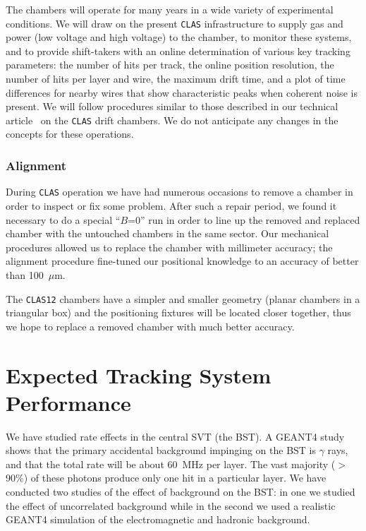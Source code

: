 The chambers will operate for many years in a wide variety of experimental
conditions.  We will draw on the present {\tt CLAS} infrastructure to supply 
gas and power (low voltage and high voltage) to the chamber, to monitor these 
systems, and to provide shift-takers with an online determination of various 
key tracking parameters: the number of hits per track, the online position 
resolution, the number of hits per layer and wire, the maximum drift time, 
and a plot of time differences for nearby wires that show characteristic 
peaks when coherent noise is present.  We will follow procedures similar to 
those described in our technical article~\cite{dcnim} on the {\tt CLAS} 
drift chambers.  We do not anticipate any changes in the concepts for these 
operations.

\subsubsection{Alignment}

During {\tt CLAS} operation we have had numerous occasions to remove a chamber
in order to inspect or fix some problem.  After such a repair period, we
found it necessary to do a special ``$B$=0'' run in order to line up the 
removed and replaced chamber with the untouched chambers in the same sector.  
Our mechanical procedures allowed us to replace the chamber with millimeter 
accuracy; the alignment procedure fine-tuned our positional knowledge to an 
accuracy of better than 100~$\mu$m.

The {\tt CLAS12} chambers have a simpler and smaller geometry (planar 
chambers in a triangular box) and the positioning fixtures will be located 
closer together, thus we hope to replace a removed chamber with much better 
accuracy.

\section{Expected Tracking System Performance}
\label{simulation}

We have studied rate effects in the central SVT (the BST).  A GEANT4 study 
shows that the primary accidental background impinging on the BST is $\gamma$ 
rays, and that the total rate will be about 60~MHz per layer.  The vast 
majority ($>$90\%) of these photons produce only one hit in a particular 
layer. We have conducted two studies of the effect of background on the BST: 
in one we studied the effect of uncorrelated background while in the second 
we used a realistic GEANT4 simulation of the electromagnetic and hadronic 
background.  

